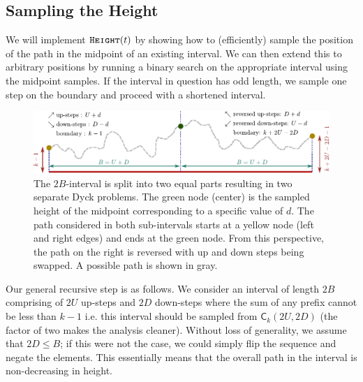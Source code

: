\subsection{Sampling the Height}
We will implement $\texttt{\textsc{Height}}(t)$ by showing how to (efficiently) sample the position of the path in the midpoint of an existing interval.
We can then extend this to arbitrary positions by running a binary search on the appropriate interval using the midpoint samples.
If the interval in question has odd length, we sample one step on the boundary and proceed with a shortened interval.
\begin{figure}[htpb]
    \centering
    \includegraphics[width=\textwidth]{images/dyck_height_sampling.pdf}
    \caption{The $2B$-interval is split into two equal parts resulting in two separate Dyck problems.
             The green node (center) is the sampled height of the midpoint corresponding to a specific value of $d$.
             The path considered in both sub-intervals starts at a yellow node (left and right edges) and ends at the green node.
             From this perspective, the path on the right is reversed with up and down steps being swapped.
             A possible path is shown in gray.}
    \label{fig:dyck_height_sampling}
\end{figure}

Our general recursive step is as follows.
We consider an interval of length $2B$ comprising of $2U$ up-steps and $2D$ down-steps where the sum of any prefix cannot be less than $k-1$
i.e. this interval should be sampled from $\mathsf C_k(2U,2D)$ (the factor of two makes the analysis cleaner).
Without loss of generality, we assume that $2D\le B$; if this were not the case, we could simply flip the sequence and negate the elements.
This essentially means that the overall path in the interval is non-decreasing in height.


